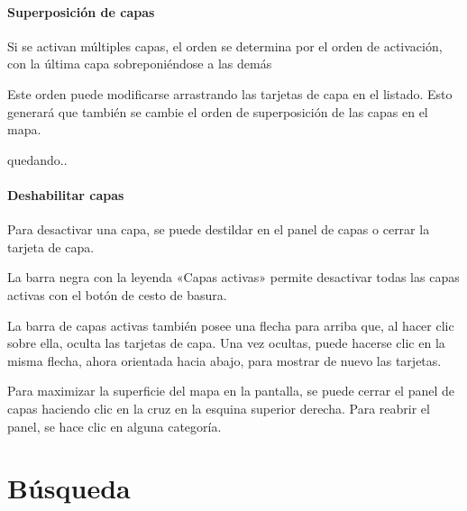 \documentclass[a4paper,11pt,spanish]{sphinxmanual}
\begin{document}
\paragraph{Superposición de capas}
\label{\detokenize{navigation/cards:superposicion-de-capas}}
\sphinxAtStartPar
Si se activan múltiples capas, el orden se determina por el orden de activación, con la última capa sobreponiéndose a las demás

\noindent{}

\sphinxAtStartPar
Este orden puede modificarse arrastrando las tarjetas de capa en el listado. Esto generará que también se cambie el orden de superposición de las capas en el mapa.

\noindent{}

\sphinxAtStartPar
quedando..

\noindent{}


\paragraph{Deshabilitar capas}
\label{\detokenize{navigation/cards:deshabilitar-capas}}
\sphinxAtStartPar
Para desactivar una capa, se puede destildar en el panel de capas o cerrar la tarjeta de capa.

\noindent{}

\sphinxAtStartPar
La barra negra con la leyenda «Capas activas» permite desactivar todas las capas activas con el botón de cesto de basura.

\noindent{}

\sphinxAtStartPar
La barra de capas activas también posee una flecha para arriba que, al hacer clic sobre ella, oculta las tarjetas de capa. Una vez ocultas, puede hacerse clic en la misma flecha, ahora orientada hacia abajo, para mostrar de nuevo las tarjetas.

\noindent{}

\sphinxAtStartPar
Para maximizar la superficie del mapa en la pantalla, se puede cerrar el panel de capas haciendo clic en la cruz en la esquina superior derecha. Para reabrir el panel, se hace clic en alguna categoría.

\noindent{}

\sphinxstepscope


\section{Búsqueda}
\label{\detokenize{search/index:busqueda}}\label{\detokenize{search/index::doc}}
\sphinxstepscope
\end{document}
